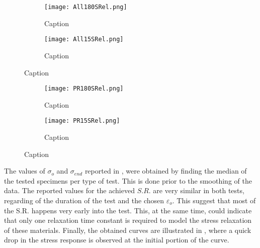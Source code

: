 \begin{figure}[H]
    \centering
        \begin{subfigure}[b]{0.93\textwidth}
        \centering
        \texttt{[image: All180SRel.png]}
        \caption{Caption}
        \label{sfig:ALL180SRel}
    \end{subfigure}
    \begin{subfigure}[b]{0.93\textwidth}
        \centering
        \texttt{[image: All15SRel.png]}
        \caption{Caption}
        \label{sfig:centering}
    \end{subfigure}
    \caption{Caption}
    \label{fig:AllSRel}
\end{figure}

\newpage
\begin{figure}[H]
    \centering
        \begin{subfigure}[b]{0.93\textwidth}
        \centering
        \texttt{[image: PR180SRel.png]}
        \caption{Caption}
        \label{sfig:PR180SRel}
    \end{subfigure}
    \begin{subfigure}[b]{0.93\textwidth}
        \centering
        \texttt{[image: PR15SRel.png]}
        \caption{Caption}
        \label{sfig:PR15SRel}
    \end{subfigure}
    \caption{Caption}
    \label{fig:PRSRel}
\end{figure}

The values of $\sigma_o$ and $\sigma_{end}$ reported in , were obtained by finding the median of the tested specimens per type of test. This is done prior to the smoothing of the data. The reported values for the achieved $S.R.$ are very similar in both tests, regarding of the duration of the test and the chosen $\varepsilon_o$. This suggest that most of the S.R. happens very early into the test. This, at the same time, could indicate that only one relaxation time constant is required to model the stress relaxation of these materials. Finally, the obtained curves are illustrated in , where a quick drop in the stress response is observed at the initial portion of the curve.


